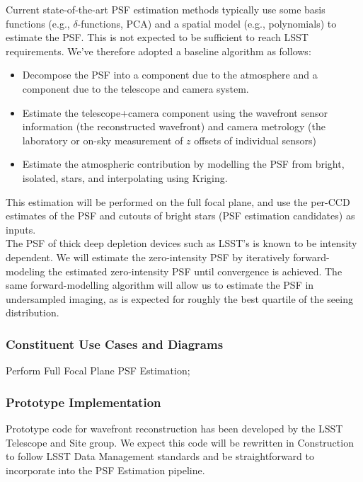 \documentclass[12pt]{article}
\begin{document}
Current state-of-the-art PSF estimation methods typically use some basis functions (e.g., $\delta$-functions, PCA) and a spatial model (e.g., polynomials) to estimate the PSF. This is not expected to be sufficient to reach LSST requirements. We've therefore adopted a baseline algorithm as follows:
\begin{itemize}
    \item Decompose the PSF into a component due to the atmosphere and a component due to the telescope and camera system.
    \item Estimate the telescope+camera component using the wavefront sensor information (the reconstructed wavefront) and camera metrology (the laboratory or on-sky measurement of $z$ offsets of individual sensors)
    \item Estimate the atmospheric contribution by modelling the PSF from bright, isolated, stars, and interpolating using Kriging. %
\end{itemize}
This estimation will be performed on the full focal plane, and use the per-CCD estimates of the PSF and cutouts of bright stars (PSF estimation candidates) as inputs.
\\
The PSF of thick deep depletion devices such as LSST's is known to be intensity dependent. We will estimate the zero-intensity PSF by iteratively forward-modeling the estimated zero-intensity PSF until convergence is achieved. The same forward-modelling algorithm will allow us to estimate the PSF in undersampled imaging, as is expected for roughly the best quartile of the seeing distribution.

\subsubsection{Constituent Use Cases and Diagrams}

Perform Full Focal Plane PSF Estimation;

\subsubsection{Prototype Implementation}

Prototype code for wavefront reconstruction has been developed by the LSST Telescope and Site group. We expect this code will be rewritten in Construction to follow LSST Data Management standards and be straightforward to incorporate into the PSF Estimation pipeline.
\\
\end{document}
